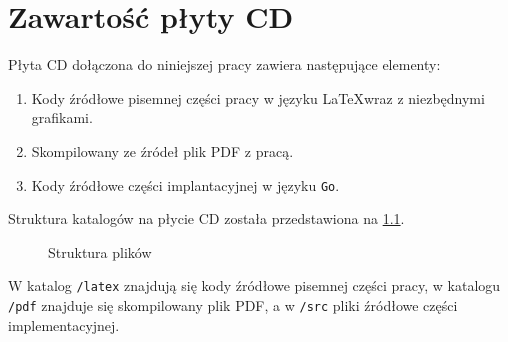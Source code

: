 \chapter{Zawartość płyty CD}
\thispagestyle{chapterBeginStyle}
\label{plytaCD}

Płyta CD dołączona do niniejszej pracy zawiera następujące elementy:
\begin{enumerate}
    \item Kody źródłowe pisemnej części pracy w języku \LaTeX wraz z niezbędnymi grafikami.
    \item Skompilowany ze źródeł plik PDF z pracą.
    \item Kody źródłowe części implantacyjnej w języku \texttt{Go}.
\end{enumerate}

Struktura katalogów na płycie CD została przedstawiona na \ref{fig:dir_structure}.

\begin{figure}[h]
    \centering
    \caption{Struktura plików}
    \label{fig:dir_structure}
\end{figure}
W katalog \texttt{/latex} znajdują się kody źródłowe pisemnej części pracy, w katalogu \texttt{/pdf} znajduje się skompilowany plik PDF, a w \texttt{/src} pliki źródłowe części implementacyjnej.
